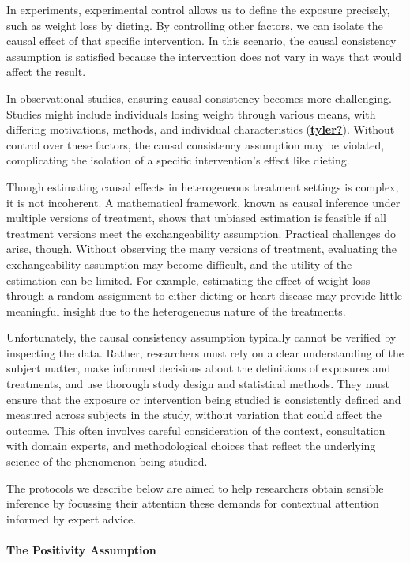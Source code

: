 \documentclass[
  singlecolumn]{article}
\let\oldparagraph\paragraph
\renewcommand{\paragraph}[1]{\oldparagraph{#1}\mbox{}}
\begin{document}
In experiments, experimental control allows us to define the exposure
precisely, such as weight loss by dieting. By controlling other factors,
we can isolate the causal effect of that specific intervention. In this
scenario, the causal consistency assumption is satisfied because the
intervention does not vary in ways that would affect the result.

In observational studies, ensuring causal consistency becomes more
challenging. Studies might include individuals losing weight through
various means, with differing motivations, methods, and individual
characteristics (\protect\hyperlink{ref-tyler}{\textbf{tyler?}}).
Without control over these factors, the causal consistency assumption
may be violated, complicating the isolation of a specific intervention's
effect like dieting.

Though estimating causal effects in heterogeneous treatment settings is
complex, it is not incoherent. A mathematical framework, known as causal
inference under multiple versions of treatment, shows that unbiased
estimation is feasible if all treatment versions meet the
exchangeability assumption. Practical challenges do arise, though.
Without observing the many versions of treatment, evaluating the
exchangeability assumption may become difficult, and the utility of the
estimation can be limited. For example, estimating the effect of weight
loss through a random assignment to either dieting or heart disease may
provide little meaningful insight due to the heterogeneous nature of the
treatments.

Unfortunately, the causal consistency assumption typically cannot be
verified by inspecting the data. Rather, researchers must rely on a
clear understanding of the subject matter, make informed decisions about
the definitions of exposures and treatments, and use thorough study
design and statistical methods. They must ensure that the exposure or
intervention being studied is consistently defined and measured across
subjects in the study, without variation that could affect the outcome.
This often involves careful consideration of the context, consultation
with domain experts, and methodological choices that reflect the
underlying science of the phenomenon being studied.

The protocols we describe below are aimed to help researchers obtain
sensible inference by focussing their attention these demands for
contextual attention informed by expert advice.

\hypertarget{the-positivity-assumption}{%
\paragraph{\texorpdfstring{\textbf{The Positivity
Assumption}}{The Positivity Assumption}}\label{the-positivity-assumption}}
\end{document}
